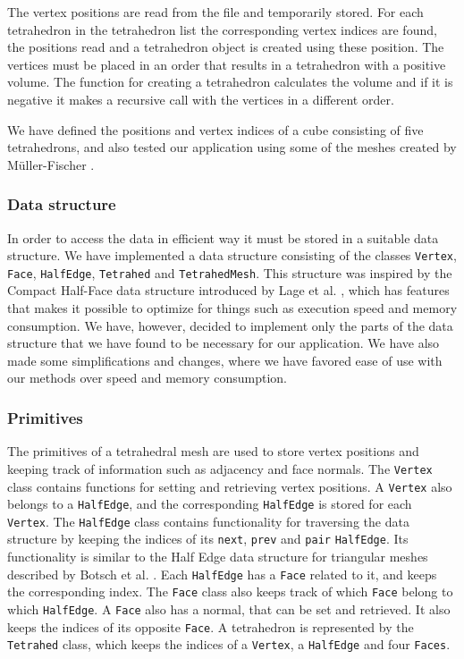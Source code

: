 \documentclass[10pt,a4paper]{article}
\begin{document}
The vertex positions are read from the file and temporarily stored. For each tetrahedron in the tetrahedron list the corresponding vertex indices are found, the positions read and a tetrahedron object is created using these position. The vertices must be placed in an order that results in a tetrahedron with a positive volume. The function for creating a tetrahedron calculates the volume and if it is negative it makes a recursive call with the vertices in a different order.

We have defined the positions and vertex indices of a cube consisting of five tetrahedrons, and also tested our application using some of the meshes created by M\"uller-Fischer \cite{meshes}.


\subsubsection{Data structure}
In order to access the data in efficient way it must be stored in a suitable data structure. We have implemented a data structure consisting of the classes \texttt{Vertex}, \texttt{Face}, \texttt{HalfEdge}, \texttt{Tetrahed} and \texttt{TetrahedMesh}. This structure was inspired by the Compact Half-Face data structure introduced by Lage et al. \cite{halfface}, which has features that makes it possible to optimize for things such as execution speed and memory consumption. We have, however, decided to implement only the parts of the data structure that we have found to be necessary for our application. We have also made some simplifications and changes, where we have favored ease of use with our methods over speed and memory consumption.

\subsubsection{Primitives}
The primitives of a tetrahedral mesh are used to store vertex positions and keeping track of information such as adjacency and face normals. The \texttt{Vertex} class contains functions for setting and retrieving vertex positions. A \texttt{Vertex} also belongs to a \texttt{HalfEdge}, and the corresponding \texttt{HalfEdge} is stored for each \texttt{Vertex}. The \texttt{HalfEdge} class contains functionality for traversing the data structure by keeping the indices of its \texttt{next}, \texttt{prev} and \texttt{pair} \texttt{HalfEdge}. Its functionality is similar to the Half Edge data structure for triangular meshes described by Botsch et al. \cite{Botsch}. Each \texttt{HalfEdge} has a \texttt{Face} related to it, and keeps the corresponding index. The \texttt{Face} class also keeps track of which \texttt{Face} belong to which \texttt{HalfEdge}. A \texttt{Face} also has a normal, that can be set and retrieved. It also keeps the indices of its opposite \texttt{Face}. A tetrahedron is represented by the \texttt{Tetrahed} class, which keeps the indices of a \texttt{Vertex}, a \texttt{HalfEdge} and four \texttt{Faces}.
\end{document}
